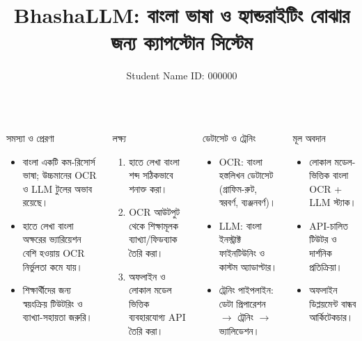 \documentclass[final]{beamer}
\title{\Huge \textbf{BhashaLLM:} বাংলা ভাষা ও হ্যান্ডরাইটিং বোঝার জন্য ক্যাপস্টোন সিস্টেম}
\author{\Large Student Name \quad \textbar \quad ID: 000000}
\institute{\Large Department of CSE \quad \textbar \quad University Name}
\begin{document}
\begin{frame}[t]
\begin{columns}[t]

\begin{block}{সমস্যা ও প্রেরণা}
\vspace{0.2cm}
\begin{itemize}
  \item বাংলা একটি কম-রিসোর্স ভাষা; উচ্চমানের OCR ও LLM টুলের অভাব রয়েছে।
  \item হাতে লেখা বাংলা অক্ষরের ভ্যারিয়েশন বেশি হওয়ায় OCR নির্ভুলতা কমে যায়।
  \item শিক্ষার্থীদের জন্য স্বয়ংক্রিয় টিউটরিং ও ব্যাখ্যা-সহায়তা জরুরি।
\end{itemize}
\end{block}

\begin{block}{লক্ষ্য}
\vspace{0.2cm}
\begin{enumerate}
  \item হাতে লেখা বাংলা শব্দ সঠিকভাবে শনাক্ত করা।
  \item OCR আউটপুট থেকে শিক্ষামূলক ব্যাখ্যা/ফিডব্যাক তৈরি করা।
  \item অফলাইন ও লোকাল মডেল ভিত্তিক ব্যবহারযোগ্য API তৈরি করা।
\end{enumerate}
\end{block}

\begin{block}{ডেটাসেট ও ট্রেনিং}
\vspace{0.2cm}
\begin{itemize}
  \item OCR: বাংলা হস্তলিখন ডেটাসেট (গ্রাফিম-রুট, স্বরবর্ণ, ব্যঞ্জনবর্ণ)।
  \item LLM: বাংলা ইনস্ট্রাক্ট ফাইনটিউনিং ও কাস্টম অ্যাডাপ্টার।
  \item ট্রেনিং পাইপলাইন: ডেটা প্রিপারেশন $\rightarrow$ ট্রেনিং $\rightarrow$ ভ্যালিডেশন।
\end{itemize}
\end{block}

\begin{alertblock}{মূল অবদান}
\vspace{0.2cm}
\begin{itemize}
  \item লোকাল মডেল-ভিত্তিক বাংলা OCR + LLM স্ট্যাক।
  \item API-চালিত টিউটর ও দার্শনিক প্রতিক্রিয়া।
  \item অফলাইন ডিপ্লয়মেন্ট বান্ধব আর্কিটেকচার।
\end{itemize}
\end{alertblock}


\end{columns}
\end{frame}
\end{document}
